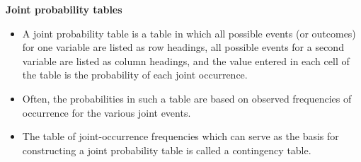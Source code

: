 


\noindent \textbf{Joint probability tables}
\begin{itemize}
	\item A joint probability table is a table in which all possible events (or outcomes) for one variable are listed as
	row headings, all possible events for a second variable are listed as column headings, and the value entered in
	each cell of the table is the probability of each joint occurrence. 
	
	\item Often, the probabilities in such a table are based
	on observed frequencies of occurrence for the various joint events. 
	\item The table
	of joint-occurrence frequencies which can serve as the basis for constructing a joint probability table is called a
	contingency table.
\end{itemize}

